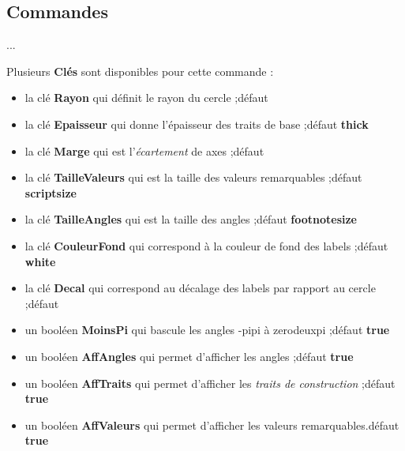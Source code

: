 \documentclass[a4paper,french,11pt]{article}
\newcommand\Cle[1]{{\bfseries\sffamily\textlangle #1\textrangle}}
\begin{document}
\begin{codetex}
\CercleTrigo
\end{codetex}

\subsection{Commandes}

\begin{codetex}
...
\end{codetex}

\begin{codecles}
Plusieurs \Cle{Clés} sont disponibles pour cette commande :

\begin{itemize}
	\item la clé \Cle{Rayon} qui définit le rayon du cercle ;\hfill{}défaut \Cle{3}
	\item la clé \Cle{Epaisseur} qui donne l'épaisseur des traits de base ;\hfill{}défaut \Cle{thick}
	\item la clé \Cle{Marge} qui est l'\textit{écartement} de axes  ;\hfill{}défaut \Cle{0.25}
	\item la clé \Cle{TailleValeurs} qui est la taille des valeurs remarquables ;\hfill{}défaut \Cle{scriptsize}
	\item la clé \Cle{TailleAngles} qui est la taille des angles ;\hfill{}défaut \Cle{footnotesize}
	\item la clé \Cle{CouleurFond} qui correspond à la couleur de fond des labels ;\hfill{}défaut \Cle{white}
	\item la clé \Cle{Decal} qui correspond au décalage des labels par rapport au cercle ;\hfill{}défaut \Cle{10pt}
	\item un booléen \Cle{MoinsPi} qui bascule les angles \og -pipi \fg{} à \og zerodeuxpi \fg{} ;\hfill{}défaut \Cle{true}
	\item un booléen \Cle{AffAngles} qui permet d'afficher les angles ;\hfill{}défaut \Cle{true}
	\item un booléen \Cle{AffTraits} qui permet d'afficher les \textit{traits de construction}  ;\hfill{}défaut \Cle{true}
	\item un booléen \Cle{AffValeurs} qui permet d'afficher les valeurs remarquables.\hfill{}défaut \Cle{true}
\end{itemize}
\end{codecles}
\end{document}
